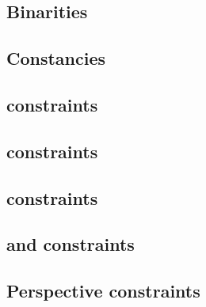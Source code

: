 \subsection{Binarities}                                                                                  \label{rlp auth: generalities: binarities}                                 
\subsection{Constancies}                                                                                 \label{rlp auth: generalities: constancies}                                
\subsection{\iomf{} constraints}                                                                         \label{rlp auth: generalities: iomf}                                       
\subsection{\userTransactionNumber{}           constraints}                                              \label{rlp auth: generalities: user transaction number}                    
\subsection{\rlpAuthMacroAuthorityTupleIndex{} constraints}                                              \label{rlp auth: generalities: authority tuple index}                      
\subsection{\transactionTypeWithAuthorityLists{} and \transactionTypeWithAuthorityLists{} constraints}   \label{rlp auth: generalities: transactions with or sans authority list}   
\subsection{Perspective constraints}                                                                     \label{rlp auth: generalities: perspectives}                               
